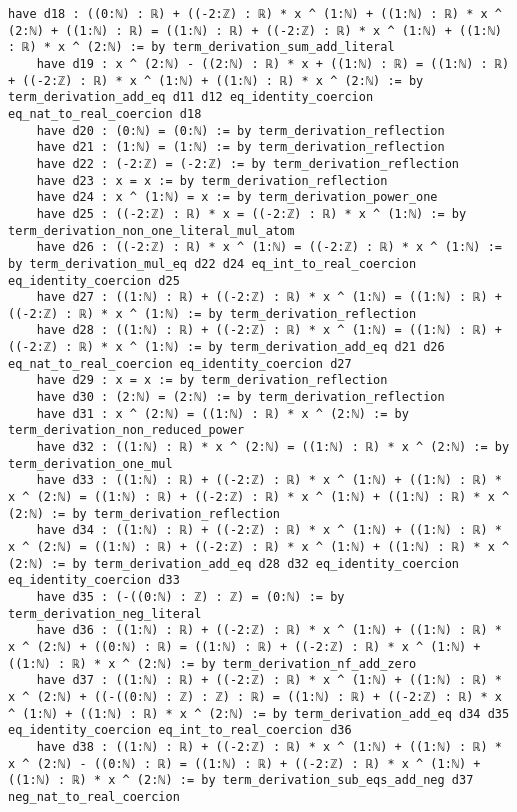 \documentclass{article}
\begin{document}
\begin{tcolorbox}[colback=white!10, width=\linewidth]
\begin{lstlisting}[language=Lean4]
    have d18 : ((0:ℕ) : ℝ) + ((-2:ℤ) : ℝ) * x ^ (1:ℕ) + ((1:ℕ) : ℝ) * x ^ (2:ℕ) + ((1:ℕ) : ℝ) = ((1:ℕ) : ℝ) + ((-2:ℤ) : ℝ) * x ^ (1:ℕ) + ((1:ℕ) : ℝ) * x ^ (2:ℕ) := by term_derivation_sum_add_literal
    have d19 : x ^ (2:ℕ) - ((2:ℕ) : ℝ) * x + ((1:ℕ) : ℝ) = ((1:ℕ) : ℝ) + ((-2:ℤ) : ℝ) * x ^ (1:ℕ) + ((1:ℕ) : ℝ) * x ^ (2:ℕ) := by term_derivation_add_eq d11 d12 eq_identity_coercion eq_nat_to_real_coercion d18
    have d20 : (0:ℕ) = (0:ℕ) := by term_derivation_reflection
    have d21 : (1:ℕ) = (1:ℕ) := by term_derivation_reflection
    have d22 : (-2:ℤ) = (-2:ℤ) := by term_derivation_reflection
    have d23 : x = x := by term_derivation_reflection
    have d24 : x ^ (1:ℕ) = x := by term_derivation_power_one
    have d25 : ((-2:ℤ) : ℝ) * x = ((-2:ℤ) : ℝ) * x ^ (1:ℕ) := by term_derivation_non_one_literal_mul_atom
    have d26 : ((-2:ℤ) : ℝ) * x ^ (1:ℕ) = ((-2:ℤ) : ℝ) * x ^ (1:ℕ) := by term_derivation_mul_eq d22 d24 eq_int_to_real_coercion eq_identity_coercion d25
    have d27 : ((1:ℕ) : ℝ) + ((-2:ℤ) : ℝ) * x ^ (1:ℕ) = ((1:ℕ) : ℝ) + ((-2:ℤ) : ℝ) * x ^ (1:ℕ) := by term_derivation_reflection
    have d28 : ((1:ℕ) : ℝ) + ((-2:ℤ) : ℝ) * x ^ (1:ℕ) = ((1:ℕ) : ℝ) + ((-2:ℤ) : ℝ) * x ^ (1:ℕ) := by term_derivation_add_eq d21 d26 eq_nat_to_real_coercion eq_identity_coercion d27
    have d29 : x = x := by term_derivation_reflection
    have d30 : (2:ℕ) = (2:ℕ) := by term_derivation_reflection
    have d31 : x ^ (2:ℕ) = ((1:ℕ) : ℝ) * x ^ (2:ℕ) := by term_derivation_non_reduced_power
    have d32 : ((1:ℕ) : ℝ) * x ^ (2:ℕ) = ((1:ℕ) : ℝ) * x ^ (2:ℕ) := by term_derivation_one_mul
    have d33 : ((1:ℕ) : ℝ) + ((-2:ℤ) : ℝ) * x ^ (1:ℕ) + ((1:ℕ) : ℝ) * x ^ (2:ℕ) = ((1:ℕ) : ℝ) + ((-2:ℤ) : ℝ) * x ^ (1:ℕ) + ((1:ℕ) : ℝ) * x ^ (2:ℕ) := by term_derivation_reflection
    have d34 : ((1:ℕ) : ℝ) + ((-2:ℤ) : ℝ) * x ^ (1:ℕ) + ((1:ℕ) : ℝ) * x ^ (2:ℕ) = ((1:ℕ) : ℝ) + ((-2:ℤ) : ℝ) * x ^ (1:ℕ) + ((1:ℕ) : ℝ) * x ^ (2:ℕ) := by term_derivation_add_eq d28 d32 eq_identity_coercion eq_identity_coercion d33
    have d35 : (-((0:ℕ) : ℤ) : ℤ) = (0:ℕ) := by term_derivation_neg_literal
    have d36 : ((1:ℕ) : ℝ) + ((-2:ℤ) : ℝ) * x ^ (1:ℕ) + ((1:ℕ) : ℝ) * x ^ (2:ℕ) + ((0:ℕ) : ℝ) = ((1:ℕ) : ℝ) + ((-2:ℤ) : ℝ) * x ^ (1:ℕ) + ((1:ℕ) : ℝ) * x ^ (2:ℕ) := by term_derivation_nf_add_zero
    have d37 : ((1:ℕ) : ℝ) + ((-2:ℤ) : ℝ) * x ^ (1:ℕ) + ((1:ℕ) : ℝ) * x ^ (2:ℕ) + ((-((0:ℕ) : ℤ) : ℤ) : ℝ) = ((1:ℕ) : ℝ) + ((-2:ℤ) : ℝ) * x ^ (1:ℕ) + ((1:ℕ) : ℝ) * x ^ (2:ℕ) := by term_derivation_add_eq d34 d35 eq_identity_coercion eq_int_to_real_coercion d36
    have d38 : ((1:ℕ) : ℝ) + ((-2:ℤ) : ℝ) * x ^ (1:ℕ) + ((1:ℕ) : ℝ) * x ^ (2:ℕ) - ((0:ℕ) : ℝ) = ((1:ℕ) : ℝ) + ((-2:ℤ) : ℝ) * x ^ (1:ℕ) + ((1:ℕ) : ℝ) * x ^ (2:ℕ) := by term_derivation_sub_eqs_add_neg d37 neg_nat_to_real_coercion

\end{lstlisting}
\end{tcolorbox}
\end{document}
